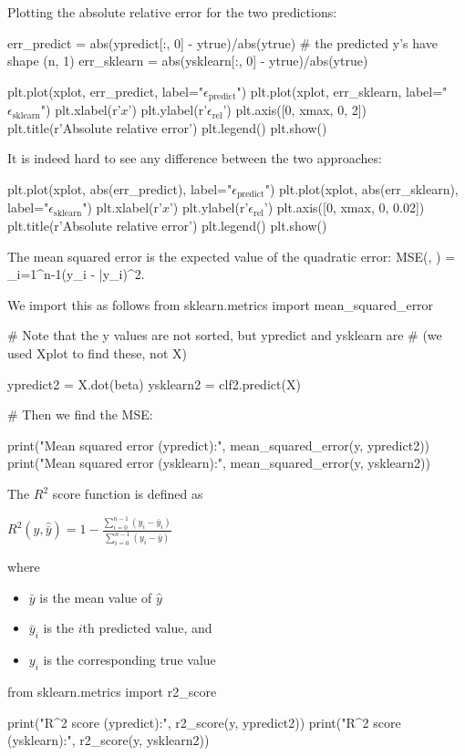 \documentclass[%
oneside,                 %
final,                   %
10pt]{article}
\begin{document}
Plotting the absolute relative error for the two predictions:


\bpycod
err_predict = abs(ypredict[:, 0] - ytrue)/abs(ytrue) # the predicted y's have shape (n, 1)
err_sklearn = abs(ysklearn[:, 0] - ytrue)/abs(ytrue)

plt.plot(xplot, err_predict, label="$\epsilon_{\mathrm{predict}}$")
plt.plot(xplot, err_sklearn, label="$\epsilon_{\mathrm{sklearn}}$")
plt.xlabel(r'$x$')
plt.ylabel(r'$\epsilon_{\mathrm{rel}}$')
plt.axis([0, xmax, 0, 2])
plt.title(r'Absolute relative error')
plt.legend()
plt.show()
\epycod

It is indeed hard to see any difference between the two approaches:


\bpycod
plt.plot(xplot, abs(err_predict), label="$\epsilon_{\mathrm{predict}}$")
plt.plot(xplot, abs(err_sklearn), label="$\epsilon_{\mathrm{sklearn}}$")
plt.xlabel(r'$x$')
plt.ylabel(r'$\epsilon_{\mathrm{rel}}$')
plt.axis([0, xmax, 0, 0.02])
plt.title(r'Absolute relative error')
plt.legend()
plt.show()
\epycod

The mean squared error is the expected value of the quadratic error:
MSE\left(, \right) = \sum\limits_{i=1}^{n-1}\left(y_i - \bar{y}_i\right)^2.

We import this as follows
\bpycod
from sklearn.metrics import mean_squared_error

# Note that the y values are not sorted, but ypredict and ysklearn are
# (we used Xplot to find these, not X)

ypredict2 = X.dot(beta)
ysklearn2 = clf2.predict(X)

# Then we find the MSE:

print("Mean squared error (ypredict):", mean_squared_error(y, ypredict2))
print("Mean squared error (ysklearn):", mean_squared_error(y, ysklearn2))
\epycod

The $R^2$ score function is defined as

$R^2\left(\hat{y}, \hat{\bar{y}}\right) = 1 - \frac{\sum\limits_{i=0}^{n-1}\left(y_i - \bar{y}_i\right)}{\sum\limits_{i=0}^{n-1}\left(y_i - \bar{y}\right)}$

where 

\begin{itemize}
\item $\bar{y}$ is the mean value of $\hat{y}$

\item $\bar{y}_i$ is the $i$th predicted value, and

\item $y_i$ is the corresponding true value
\end{itemize}

\noindent
\bpycod
from sklearn.metrics import r2_score

print("R^2 score (ypredict):", r2_score(y, ypredict2))
print("R^2 score (ysklearn):", r2_score(y, ysklearn2))
\epycod



\end{document}
